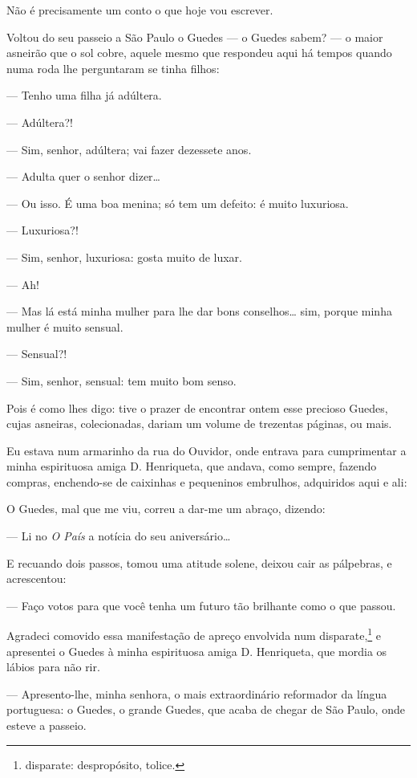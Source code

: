 
\noindent{}Não é precisamente um conto o que hoje vou escrever.

Voltou do seu passeio a São Paulo o Guedes --- o Guedes sabem? --- o
maior asneirão que o sol cobre, aquele mesmo que respondeu aqui há
tempos quando numa roda lhe perguntaram se tinha filhos:

--- Tenho uma filha já adúltera.

--- Adúltera?!

--- Sim, senhor, adúltera; vai fazer dezessete anos.

--- Adulta quer o senhor dizer\ldots{}

--- Ou isso. É uma boa menina; só tem um defeito: é muito luxuriosa.

--- Luxuriosa?!

--- Sim, senhor, luxuriosa: gosta muito de luxar.

--- Ah!

--- Mas lá está minha mulher para lhe dar bons conselhos\ldots{} sim, porque
minha mulher é muito sensual.

--- Sensual?!

--- Sim, senhor, sensual: tem muito bom senso.

Pois é como lhes digo: tive o prazer de encontrar ontem esse precioso
Guedes, cujas asneiras, colecionadas, dariam um volume de trezentas
páginas, ou mais.

Eu estava num armarinho da rua do Ouvidor, onde entrava para
cumprimentar a minha espirituosa amiga D. Henriqueta, que andava, como
sempre, fazendo compras, enchendo-se de caixinhas e pequeninos
embrulhos, adquiridos aqui e ali:

O Guedes, mal que me viu, correu a dar-me um abraço, dizendo:

--- Li no \emph{O País} a notícia do seu aniversário\ldots{}

E recuando dois passos, tomou uma atitude solene, deixou cair as
pálpebras, e acrescentou:

--- Faço votos para que você tenha um futuro tão brilhante como o que
passou.

Agradeci comovido essa manifestação de apreço envolvida num
disparate,\footnote{disparate: despropósito, tolice.} e apresentei o
Guedes à minha espirituosa amiga D. Henriqueta, que mordia os lábios
para não rir.

--- Apresento-lhe, minha senhora, o mais extraordinário reformador da
língua portuguesa: o Guedes, o grande Guedes, que acaba de chegar de São
Paulo, onde esteve a passeio.

